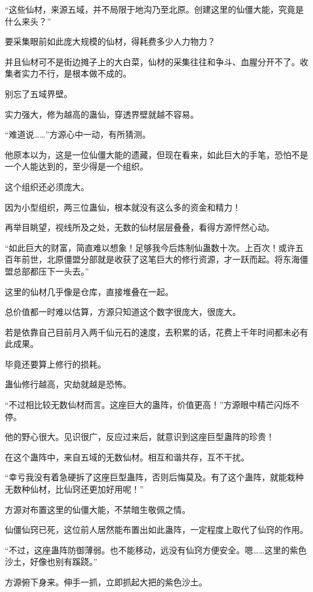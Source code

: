 \begin{this_body}
“这些仙材，来源五域，并不局限于地沟乃至北原。创建这里的仙僵大能，究竟是什么来头？”

要采集眼前如此庞大规模的仙材，得耗费多少人力物力？

并且仙材可不是街边摊子上的大白菜，仙材的采集往往和争斗、血腥分开不了。收集者实力不行，是根本做不成的。

别忘了五域界壁。

实力强大，修为越高的蛊仙，穿透界壁就越不容易。

“难道说……”方源心中一动，有所猜测。

他原本以为，这是一位仙僵大能的遗藏，但现在看来，如此巨大的手笔，恐怕不是一个人能达到的，至少得是一个组织。

这个组织还必须庞大。

因为小型组织，两三位蛊仙，根本就没有这么多的资金和精力！

再举目眺望，视线所及之处，无数的仙材层层叠叠，看得方源怦然心动。

“如此巨大的财富，简直难以想象！足够我今后炼制仙蛊数十次。上百次！或许五百年前世，北原僵盟分部就是收获了这笔巨大的修行资源，才一跃而起。将东海僵盟总部都压下一头去。”

这里的仙材几乎像是仓库，直接堆叠在一起。

总价值都一时难以估算，方源只知道这个数字很庞大，很庞大。

若是依靠自己目前月入两千仙元石的速度，去积累的话，花费上千年时间都未必有此成果。

毕竟还要算上修行的损耗。

蛊仙修行越高，灾劫就越是恐怖。

“不过相比较无数仙材而言。这座巨大的蛊阵，价值更高！”方源眼中精芒闪烁不停。

他的野心很大。见识很广，反应过来后，就意识到这座巨型蛊阵的珍贵！

在这个蛊阵中，来自五域的无数仙材。相互和谐共存，互不干扰。

“幸亏我没有着急硬拆了这座巨型蛊阵，否则后悔莫及。有了这个蛊阵，就能栽种无数种仙材，比仙窍还更加好用呢！”

方源对布置这里的仙僵大能，不禁暗生敬佩之情。

仙僵仙窍已死，这位前人居然能布置出如此蛊阵，一定程度上取代了仙窍的作用。

“不过，这座蛊阵防御薄弱。也不能移动，远没有仙窍方便安全。嗯……这里的紫色沙土，好像也别有蹊跷。”

方源俯下身来。伸手一抓，立即抓起大把的紫色沙土。


\end{this_body}

